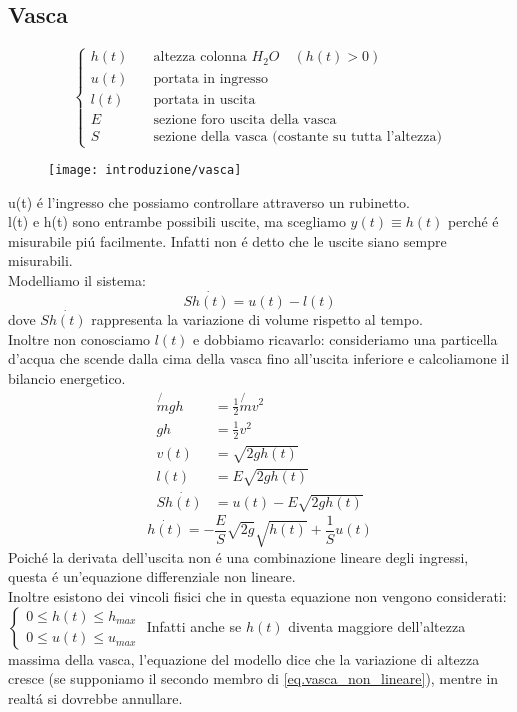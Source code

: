 \documentclass[../main.tex]{subfiles}
\begin{document}
	\subsection{Vasca}
		\[
			\begin{cases}
				h(t) & \quad \text{altezza colonna $H_{2}O$} \quad (h(t)>0)\\
				u(t) & \quad \text{portata in ingresso}\\
				l(t) & \quad \text{portata in uscita}\\
				E & \quad \text{sezione foro uscita della vasca}\\
				S & \quad \text{sezione della vasca (costante su tutta l'altezza)}
			\end{cases}
		\]
		\begin{figure}[h!]
			\centering
			\texttt{[image: introduzione/vasca]}
		\end{figure}
		u(t) \'e l'ingresso che possiamo controllare attraverso un rubinetto.\\
		l(t) e h(t) sono entrambe possibili uscite, ma scegliamo $y(t) \equiv h(t)$ perch\'e \'e misurabile pi\'u facilmente. Infatti non \'e detto che le uscite siano sempre misurabili.\\
		Modelliamo il sistema:
		\begin{equation}
			S \dot{h(t)} = u(t) - l(t)
		\end{equation}
		dove $S \dot{h(t)}$ rappresenta la variazione di volume rispetto al tempo.\\
		Inoltre non conosciamo $l(t)$ e dobbiamo ricavarlo: consideriamo una particella d'acqua che scende dalla cima della vasca fino all'uscita inferiore e calcoliamone il bilancio energetico.
		\begin{align*}
			\not{m} gh &= \frac{1}{2} \not{m} v^2\\
			gh &= \frac{1}{2} v^2\\
			v(t) &= \sqrt{2gh(t)}\\
			l(t) &= E \sqrt{2gh(t)}\\
			S \dot{h(t)} &= u(t) - E \sqrt{2gh(t)}
		\end{align*}
		\begin{equation} \label{eq.vasca_non_lineare}
			\dot{h(t)} = - \frac{E}{S} \sqrt{2g} \sqrt{h(t)} + \frac{1}{S} u(t)
		\end{equation}
		Poiché la derivata dell'uscita non \'e una combinazione lineare degli ingressi, questa \'e un'equazione differenziale non lineare.\\
		Inoltre esistono dei vincoli fisici che in questa equazione non vengono considerati: 
		\(
			\begin{cases}
				0 \leq h(t) \leq h_{max}\\
				0 \leq u(t) \leq u_{max}
			\end{cases}
		\)
		Infatti anche se $h(t)$ diventa maggiore dell'altezza massima della vasca, l'equazione del modello dice che la variazione di altezza cresce (se supponiamo il secondo membro di \ref{eq.vasca_non_lineare}), mentre in realt\'a si dovrebbe annullare.
		
\end{document}
